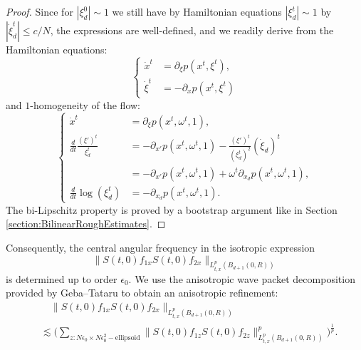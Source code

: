 \documentclass{amsart}
\theoremstyle{definition}
\begin{document}
\begin{proof}
Since for $|\xi_d^0| \sim 1$ we still have by Hamiltonian equations $|\xi_d^t| \sim 1$ by $|\dot{\xi}_d^t| \leq c/N$, the expressions are well-defined, and we readily derive from the Hamiltonian equations:
\begin{equation*}
\left\{ \begin{array}{cl}
\dot{x}^t &= \partial_{\xi} p(x^t,\xi^t), \\
\dot{\xi}^t &= - \partial_x p(x^t,\xi^t)
\end{array} \right.
\end{equation*}
and $1$-homogeneity of the flow:
\begin{equation*}
\left\{ \begin{array}{cl}
\dot{x}^t &= \partial_{\xi} p(x^t,\omega^t,1), \\
\frac{d}{dt} \frac{(\xi')^t}{\xi_d^t} &= -\partial_{x'} p(x^t,\omega^t,1) - \frac{(\xi')^t}{(\xi_d^t)^2} (\dot{\xi}_d)^t \\
&= - \partial_{x'} p(x^t,\omega^t,1) + \omega^t \partial_{x_d} p(x^t,\omega^t,1), \\
\frac{d}{dt} \log(\xi_d^t) &= - \partial_{x_d} p(x^t,\omega^t,1).
 \end{array} \right.
\end{equation*}
The bi-Lipschitz property is proved by a bootstrap argument like in Section \ref{section:BilinearRoughEstimates}.
\end{proof}
Consequently, the central angular frequency in the isotropic expression
\begin{equation*}
\| S(t,0) f_{1x} S(t,0) f_{2x} \|_{L^p_{t,x}(B_{d+1}(0,R))}
\end{equation*}
is determined up to order $\epsilon_0$. We use the anisotropic wave packet decomposition provided by Geba--Tataru \cite{GebaTataru2007} to obtain an anisotropic refinement:
\begin{equation}
\label{eq:AnisotropicAlmostOrthogonality}
\begin{split}
&\quad \| S(t,0) f_{1x} S(t,0) f_{2x} \|_{L^p_{t,x}(B_{d+1}(0,R))} \\
 &\lesssim \big( \sum_{z: N \epsilon_0 \times N \epsilon_0^2 - \text{ellipsoid}} \| S(t,0) f_{1z} S(t,0) f_{2z} \|_{L^p_{t,x}(B_{d+1}(0,R))}^p \big)^{\frac{1}{p}}.
 \end{split}
\end{equation}
\end{document}
